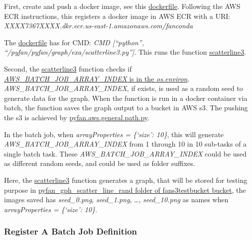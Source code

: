 \documentclass[
]{book}
\begin{document}
First, create and push a docker image, see this \href{https://fanwangecon.github.io/pyfan/vig/docker/setup/htmlpdfr/fs_docker_ecr.html\#141_Example_Docker_File_for_AWS}{dockerfile}. Following the AWS ECR instructions, this registers a docker image in AWS ECR with a URI: \emph{XXXX7367XXXX.dkr.ecr.us-east-1.amazonaws.com/fanconda}

The \href{https://fanwangecon.github.io/pyfan/vig/docker/setup/htmlpdfr/fs_docker_ecr.html\#141_Example_Docker_File_for_AWS}{dockerfile} has for CMD: \emph{CMD {[}``python'', ``/pyfan/pyfan/graph/exa/scatterline3.py''{]}}. This runs the function \href{https://github.com/FanWangEcon/pyfan/blob/master/pyfan/graph/exa/scatterline3.py}{scatterline3}.

Second, the \href{https://github.com/FanWangEcon/pyfan/blob/master/pyfan/graph/exa/scatterline3.py}{scatterline3} function checks if \href{https://github.com/FanWangEcon/pyfan/blob/master/pyfan/graph/exa/scatterline3.py\#L167}{\emph{AWS\_BATCH\_JOB\_ARRAY\_INDEX} is in the \emph{os.environ}}. \emph{AWS\_BATCH\_JOB\_ARRAY\_INDEX}, if exists, is used as a random seed to generate data for the graph. When the function is run in a docker container via batch, the function saves the graph output to a bucket in AWS s3. The pushing the s3 is achieved by \href{https://github.com/FanWangEcon/pyfan/blob/master/pyfan/aws/general/path.py}{pyfan.aws.general.path.py}.

In the batch job, when \emph{arrayProperties = \{`size': 10\}}, this will generate \emph{AWS\_BATCH\_JOB\_ARRAY\_INDEX} from 1 through 10 in 10 sub-tasks of a single batch task. These \emph{AWS\_BATCH\_JOB\_ARRAY\_INDEX} could be used as different random seeds, and could be used as folder suffixes.

Here, the \href{https://github.com/FanWangEcon/pyfan/blob/master/pyfan/graph/exa/scatterline3.py}{scatterline3} function generates a graph, that will be stored for testing purpose in \href{https://s3.console.aws.amazon.com/s3/buckets/fans3testbucket/pyfan_gph_scatter_line_rand/?region=us-east-1\&tab=overview}{pyfan\_gph\_scatter\_line\_rand folder of fans3testbucket bucket}, the images saved has \emph{seed\_0.png}, \emph{seed\_1.png}, \ldots, \emph{seed\_10.png} as names when \emph{arrayProperties = \{`size': 10\}}.

\hypertarget{register-a-batch-job-definition}{%
\subsubsection{Register A Batch Job Definition}\label{register-a-batch-job-definition}}
\end{document}
